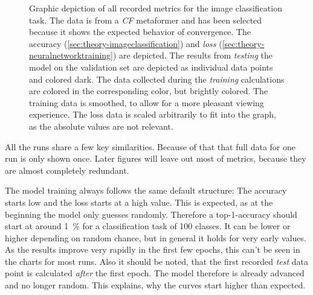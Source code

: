 \begin{figure}[htbp]
    \centering
    \caption{Graphic depiction of all recorded metrics for the image classification task.
    The data is from a \emph{CF} metaformer and has been selected because it shows the expected behavior of convergence.
    The accuracy (\autoref{sec:theory-imageclassification}) and \emph{loss} (\autoref{sec:theory-neuralnetworktraining}) are depicted. 
    The results from \emph{testing} the model on the validation set are depicted as individual data points and colored dark. 
    The data collected during the \emph{training} calculations are colored in the corresponding color, but brightly colored. The training data is smoothed, to allow for a more pleasant viewing experience.
    The loss data is scaled arbitrarily to fit into the graph, as the absolute values are not relevant. }
    \label{fig:comparison-recorded-values}
\end{figure}

All the runs share a few key similarities. Because of that that full data for one run is only shown once. 
Later figures will leave out most of metrics, because they are almost completely redundant.

The model training always follows the same default structure: The accuracy starts low and the loss starts at a high value.
This is expected, as at the beginning the model only guesses randomly. 
Therefore a top-1-accuracy should start at around \SI[]{1}[]{\percent} for a classification task of 100 classes.
It can be lower or higher depending on random chance, but in general it holds for very early values. 
As the results improve very rapidly in the first few epochs, this can't be seen in the charts for most runs.
Also it should be noted, that the first recorded \emph{test} data point is calculated \emph{after} the first epoch. 
The model therefore is already advanced and no longer random. 
This explains, why the curves start higher than expected.

